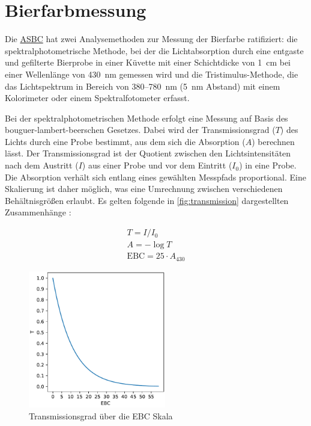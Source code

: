 \documentclass[10pt,a4paper,DIV=12,parskip=half]{scrarticle}
\begin{document}
\section*{Bierfarbmessung}

Die \href{https://www.asbcnet.org}{ASBC} hat zwei Analysemethoden zur Messung der Bierfarbe ratifiziert: die spektralphotometrische Methode, bei der die Lichtabsorption durch eine entgaste und gefilterte Bierprobe in einer Küvette mit einer Schichtdicke von 1~cm bei einer Wellenlänge von 430~nm gemessen wird und die Tristimulus-Methode, die das Lichtspektrum in Bereich von 380--780~nm (5~nm Abstand) mit einem Kolorimeter oder einem Spektralfotometer erfasst. \parencite{ASBC2011}

Bei der spektralphotometrischen Methode erfolgt eine Messung auf Basis des bouguer-lambert-beerschen Gesetzes. Dabei wird der Transmissionsgrad ($T$) des Lichts durch eine Probe bestimmt, aus dem sich die Absorption ($A$) berechnen lässt. Der Transmissionsgrad ist der Quotient zwischen den Lichtsintensitäten nach dem Austritt ($I$) aus einer Probe und vor dem Eintritt ($I_0$) in eine Probe. Die Absorption verhält sich entlang eines gewählten Messpfads proportional. Eine Skalierung ist daher möglich, was eine Umrechnung zwischen verschiedenen Behältnisgrößen erlaubt. Es gelten folgende in \autoref{fig:transmission} dargestellten Zusammenhänge \parencite{deLange2016}:

\begin{equation*}
	\begin{gathered}
		T =  I / I_0 \\
		A = -\log T \\		
		\textrm{EBC} = 25 \cdot A_{430}
	\end{gathered}
\end{equation*}

\begin{figure}[H]
	\centering
	\includegraphics[width=6cm]{transmission.pdf}
	\caption{Transmissionsgrad über die EBC Skala}
	\label{fig:transmission}
\end{figure}
\end{document}
